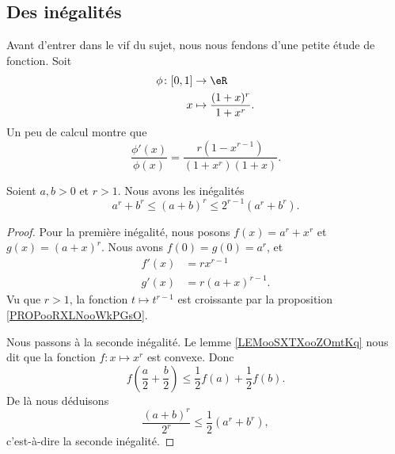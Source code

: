 \subsection{Des inégalités}

Avant d'entrer dans le vif du sujet, nous nous fendons d'une petite étude de fonction. Soit
\begin{equation}
    \begin{aligned}
        \phi\colon \mathopen[ 0 , 1 \mathclose] & \to \eR                            \\
        x                                       & \mapsto \frac{ (1+x)^r }{ 1+x^r }.
    \end{aligned}
\end{equation}
Un peu de calcul montre que
\begin{equation}
    \frac{ \phi'(x) }{ \phi(x) }=\frac{ r(1-x^{r-1}) }{ (1+x^r)(1+x) }.
\end{equation}

\begin{lemma}       \label{LEMooFKKEooDTypUd}
    Soient \( a,b>0\) et \( r>1\). Nous avons les inégalités
    \begin{equation}
        a^r+b^r\leq (a+b)^r\leq 2^{r-1}(a^r+b^r).
    \end{equation}
\end{lemma}

\begin{proof}
    Pour la première inégalité, nous posons \( f(x)=a^r+x^r\) et \( g(x)=(a+x)^r\). Nous avons \( f(0)=g(0)=a^r\), et
    \begin{subequations}
        \begin{align}
            f'(x) & =rx^{r-1}      \\
            g'(x) & =r(a+x)^{r-1}.
        \end{align}
    \end{subequations}
    Vu que \( r>1\), la fonction \( t\mapsto t^{r-1}\) est croissante par la proposition \ref{PROPooRXLNooWkPGsO}.

    Nous passons à la seconde inégalité. Le lemme \ref{LEMooSXTXooZOmtKq} nous dit que la fonction \( f\colon x\mapsto x^r \) est convexe. Donc
    \begin{equation}
        f\left( \frac{ a }{2}+\frac{ b }{2} \right)\leq\frac{ 1 }{2}f(a)+\frac{ 1 }{2}f(b).
    \end{equation}
    De là nous déduisons
    \begin{equation}
        \frac{ (a+b)^r }{ 2^r }\leq \frac{ 1 }{2}(a^r+b^r),
    \end{equation}
    c'est-à-dire la seconde inégalité.
\end{proof}

